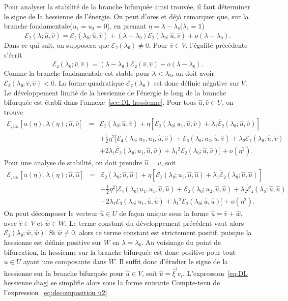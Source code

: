 \documentclass[12pt, final]{amsart}
\theoremstyle{definition}
\begin{document}
Pour analyser la stabilité de la branche bifurquée ainsi trouvée, il faut déterminer le signe de la hessienne de l'énergie. On peut d'ores et déjà remarquer que, sur la branche fondamentale(\(u₁ = u₂ = 0\)), en prenant \(η = λ - λ₀\)(\(λ₁ = 1\))
\begin{equation}
 ℰ₂(λ ; \hat{u}, \hat{v}) =ℰ₂(λ₀ ;
 \hat{u}, \hat{v}) +(λ - λ₀) \dot{ℰ}₂(λ₀ ;
 \hat{u}, \hat{v}) + o(λ - λ₀) .
\end{equation}
Dans ce qui suit, on supposera que \(\dot{ℰ}₂(λ₀) \neq 0\). Pour \(\hat{v}∈V\), l'égalité précédente s'écrit
\begin{equation}
 ℰ₂(λ₀ ; \hat{v}, \hat{v}) =(λ - λ₀)
 \dot{ℰ}₂(\hat{v}, \hat{v}) + o(λ - λ₀) .
\end{equation}
Comme la branche fondamentale est stable pour \(λ < λ₀\), on doit avoir \(\dot{ℰ}₂(λ₀ ; \hat{v}, \hat{v}) < 0\). La forme quadratique \(\dot{ℰ}₂(λ₀)\) est donc définie négative sur \(V\). Le développement limité de la hessienne de l'énergie le long de la branche bifurquée est établi dans l'annexe~\ref{sec:DL hessienne}. Pour tous \(\hat{u}, \hat{v}∈U\), on trouve
\begin{eqnarray}
 ℰ_{, u u} [u(η), λ(η) ; \hat{u}, \hat{v}] &
 = & ℰ₂(λ₀ ; \hat{u}, \hat{v}) + η [ℰ₃
 (λ₀ ; u₁, \hat{u}, \hat{v})  + λ₁
 \dot{ℰ₂}(λ₀ ; \hat{u}, \hat{v})] \nonumber\\
 & & + \tfrac{1}{2} η^2 [ℰ₄(λ₀ ; u₁, u₁,
 \hat{u}, \hat{v}) +ℰ₃(λ₀ ; u₂, \hat{u},
 \hat{v}) + λ₂ \dot{ℰ₂}(λ₀ ; \hat{u}, \hat{v})
 \nonumber\\
 & & + 2 λ₁ \dot{ℰ₃}(λ₀ ; u₁,
 \hat{u}, \hat{v}) + λ₁^2 \ddot{ℰ₂}(λ₀ ; \hat{u},
 \hat{v}) ] + o(η^2) . \label{eq:DL hessienne}
\end{eqnarray}
Pour une analyse de stabilité, on doit prendre \(\hat{u} = \hat{v}\), soit
\begin{eqnarray}
 ℰ_{, u u} [u(η), λ(η) ; \hat{u}, \hat{u}] &
 = & ℰ₂(λ₀ ; \hat{u}, \hat{u}) + η [ℰ₃
 (λ₀ ; u₁, \hat{u}, \hat{u}) + λ₁ \dot{ℰ}₂
 (λ₀ ; \hat{u}, \hat{u})] \nonumber\\
 & & + \tfrac{1}{2} η^2 [ℰ₄(λ₀ ; u₁, u₁, \hat{u},
 \hat{u}) +ℰ₃(λ₀ ; u₂, \hat{u}, \hat{u}) + λ₂
 \dot{ℰ}₂(λ₀ ; \hat{u}, \hat{u}) \nonumber\\
 & & + 2 λ₁ \dot{ℰ}₃(λ₀ ; u₁,
 \hat{u}, \hat{u}) + λ₁^2 \ddot{ℰ}₂(λ₀ ; \hat{u},
 \hat{u})] + o(η^2) . \label{eq:DL hessienne diag}
\end{eqnarray}
On peut décomposer le vecteur \(\hat{u}∈U\) de fa{\c c}on unique sous la forme \(\hat{u} = \hat{v} + \hat{w}\), avec \(\hat{v}∈V\) et \(\hat{w}∈W\). Le terme constant du développement précédent vaut alors \(ℰ₂(λ₀ ; \hat{w}, \hat{w})\). Si \(\hat{w} \neq 0\), alors ce terme constant est strictement positif, puisque la hessienne est définie positive sur \(W\) en \(λ = λ₀\). Au voisinage du point de bifurcation, la hessienne sur la branche bifurquée est donc positive pour tout \(\hat{u}∈U\) ayant une composante dans \(W\). Il suffit donc d'étudier le signe de la hessienne sur la branche bifurquée pour \(\hat{u}∈V\), soit \(\hat{u} = \hat{ξ}^i v_i\). L'expression~\eqref{eq:DL hessienne diag} se simplifie alors sous la forme suivante Compte-tenu de l'expression~\eqref{eq:decomposition u2}
\end{document}
